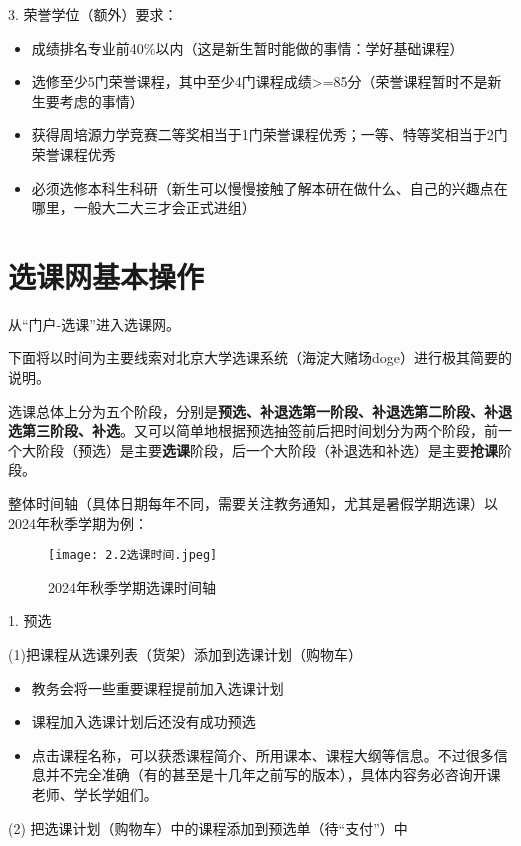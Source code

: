 \documentclass[11pt,oneside]{book}
\begin{document}
3. 荣誉学位（额外）要求：

\begin{itemize}
	\item 成绩排名专业前40\%以内（这是新生暂时能做的事情：学好基础课程）
	\item 选修至少5门荣誉课程，其中至少4门课程成绩>=85分（荣誉课程暂时不是新生要考虑的事情）
	\item 获得周培源力学竞赛二等奖相当于1门荣誉课程优秀；一等、特等奖相当于2门荣誉课程优秀
	\item 必须选修本科生科研（新生可以慢慢接触了解本研在做什么、自己的兴趣点在哪里，一般大二大三才会正式进组）
\end{itemize}

\newpage

\section{选课网基本操作}
从“门户-选课”进入选课网。

下面将以时间为主要线索对北京大学选课系统（海淀大赌场doge）进行极其简要的说明。

选课总体上分为五个阶段，分别是\textbf{\textbf{预选、补退选第一阶段、补退选第二阶段、补退选第三阶段、补选}}。又可以简单地根据预选抽签前后把时间划分为两个阶段，前一个大阶段（预选）是主要\textbf{\textbf{选课}}阶段，后一个大阶段（补退选和补选）是主要\textbf{\textbf{抢课}}阶段。

整体时间轴（具体日期每年不同，需要关注教务通知，尤其是暑假学期选课）以2024年秋季学期为例：
\begin{figure}[htbp]
	\centering
	\texttt{[image: 2.2选课时间.jpeg]}
	\renewcommand{\figurename}{图}
	\caption{2024年秋季学期选课时间轴}
	\label{fig:enter-label}
\end{figure}

1. 预选

(1)把课程从选课列表（货架）添加到选课计划（购物车）

\begin{itemize}
	\item  教务会将一些重要课程提前加入选课计划
	\item 课程加入选课计划后还没有成功预选
	\item 点击课程名称，可以获悉课程简介、所用课本、课程大纲等信息。不过很多信息并不完全准确（有的甚至是十几年之前写的版本），具体内容务必咨询开课老师、学长学姐们。
\end{itemize}

(2) 把选课计划（购物车）中的课程添加到预选单（待“支付”）中
\end{document}
